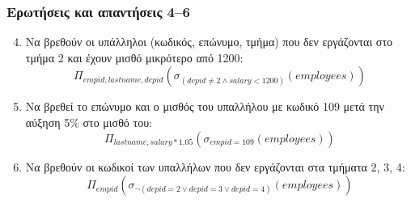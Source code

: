 \begin{frame}
\frametitle{Ερωτήσεις και απαντήσεις 4--6}
\begin{minipage}{0.94\textwidth}
  \begin{enumerate} \setcounter{enumi}{3}
    \item Να βρεθούν οι υπάλληλοι (κωδικός, επώνυμο, τμήμα)
          που δεν εργάζονται στο τμήμα 2 και έχουν μισθό μικρότερο από 1200:
          \[  \Pi_{empid, lastname, depid} \left(\sigma_{(depid\neq 2 \wedge salary < 1200)} (employees) \right) \]
    \item Να βρεθεί το επώνυμο και ο μισθός του υπαλλήλου με κωδικό
          109 μετά την αύξηση 5\% στο μισθό του:
          \[ \Pi_{lastname, salary*1.05} \left(\sigma_{empid=109}(employees)\right) \]
    \item Να βρεθούν οι κωδικοί των υπαλλήλων που δεν εργάζονται στα τμήματα 2, 3, 4:
          \[ \Pi_{empid} \left(\sigma_{ \lnot (depid=2 \vee depid=3 \vee depid=4) } (employees) \right) \]
  \end{enumerate}
\end{minipage}
\end{frame}


